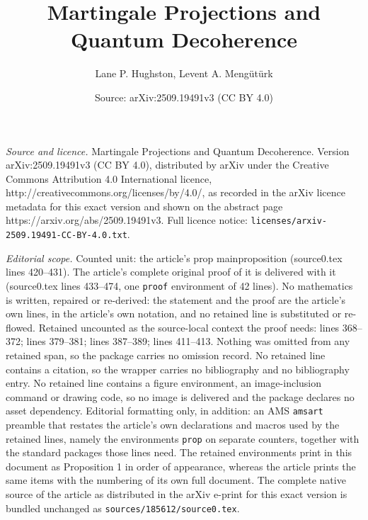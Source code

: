 \documentclass[10pt,a4paper]{amsart}
\title{Martingale Projections and Quantum Decoherence}
\author{Lane P. Hughston, Levent A. Meng\"ut\"urk}
\date{Source: arXiv:2509.19491v3 (CC BY 4.0)}
\begin{document}
\maketitle

\noindent\emph{Source and licence.} Martingale Projections and Quantum Decoherence. Version arXiv:2509.19491v3 (CC BY 4.0), distributed by arXiv under the Creative Commons Attribution 4.0 International licence, http://creativecommons.org/licenses/by/4.0/, as recorded in the arXiv licence metadata for this exact version and shown on the abstract page https://arxiv.org/abs/2509.19491v3. Full licence notice: \texttt{licenses/arxiv-2509.19491-CC-BY-4.0.txt}.\par\smallskip

\noindent\textit{Editorial scope.} Counted unit: the article's prop mainproposition (source0.tex lines 420--431). The article's complete original proof of it is delivered with it (source0.tex lines 433--474, one \texttt{proof} environment of 42 lines). No mathematics is written, repaired or re-derived: the statement and the proof are the article's own lines, in the article's own notation, and no retained line is substituted or re-flowed.  Retained uncounted as the source-local context the proof needs: lines 368--372; lines 379--381; lines 387--389; lines 411--413.  Nothing was omitted from any retained span, so the package carries no omission record.  No retained line contains a citation, so the wrapper carries no bibliography and no bibliography entry.  No retained line contains a figure environment, an image-inclusion command or drawing code, so no image is delivered and the package declares no asset dependency.  Editorial formatting only, in addition: an AMS \texttt{amsart} preamble that restates the article's own declarations and macros used by the retained lines, namely the environments \texttt{prop} on separate counters, together with the standard packages those lines need.  The retained environments print in this document as Proposition 1 in order of appearance, whereas the article prints the same items with the numbering of its own full document.  The complete native source of the article as distributed in the arXiv e-print for this exact version is bundled unchanged as \texttt{sources/185612/source0.tex}.
\end{document}

